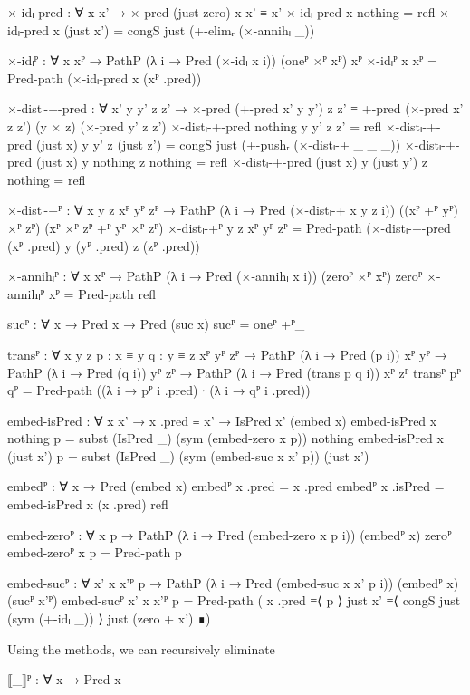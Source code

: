 \begin{code}[hide]
  ×-idₗ-pred : ∀ x x' → ×-pred (just zero) x x' ≡ x'
  ×-idₗ-pred x nothing = refl
  ×-idₗ-pred x (just x') = congS just (+-elimᵣ (×-annihₗ _))

  ×-idₗᴾ : ∀ {x} xᴾ → PathP (λ i → Pred (×-idₗ x i)) (oneᴾ ×ᴾ xᴾ) xᴾ
  ×-idₗᴾ {x} xᴾ = Pred-path (×-idₗ-pred x (xᴾ .pred))

  ×-distₗ-+-pred :
    ∀ x' y y' z z' →
    ×-pred (+-pred x' y y') z z' ≡
    +-pred (×-pred x' z z') (y × z) (×-pred y' z z')
  ×-distₗ-+-pred nothing y y' z z' = refl
  ×-distₗ-+-pred (just x) y y' z (just z') =
    congS just (+-pushᵣ (×-distₗ-+ _ _ _))
  ×-distₗ-+-pred (just x) y nothing z nothing = refl
  ×-distₗ-+-pred (just x) y (just y') z nothing = refl

  ×-distₗ-+ᴾ :
    ∀ {x y z} xᴾ yᴾ zᴾ →
    PathP (λ i → Pred (×-distₗ-+ x y z i))
      ((xᴾ +ᴾ yᴾ) ×ᴾ zᴾ) (xᴾ ×ᴾ zᴾ +ᴾ yᴾ ×ᴾ zᴾ)
  ×-distₗ-+ᴾ {y} {z} xᴾ yᴾ zᴾ =
    Pred-path (×-distₗ-+-pred (xᴾ .pred) y (yᴾ .pred) z (zᴾ .pred))

  ×-annihₗᴾ : ∀ {x} xᴾ → PathP (λ i → Pred (×-annihₗ x i)) (zeroᴾ ×ᴾ xᴾ) zeroᴾ
  ×-annihₗᴾ xᴾ = Pred-path refl

  sucᴾ : ∀ {x} → Pred x → Pred (suc x)
  sucᴾ = oneᴾ +ᴾ_

  transᴾ :
    ∀ {x y z} {p : x ≡ y} {q : y ≡ z} {xᴾ yᴾ zᴾ} →
    PathP (λ i → Pred (p i)) xᴾ yᴾ → PathP (λ i → Pred (q i)) yᴾ zᴾ →
    PathP (λ i → Pred (trans p q i)) xᴾ zᴾ
  transᴾ pᴾ qᴾ = Pred-path ((λ i → pᴾ i .pred) ∙ (λ i → qᴾ i .pred))

  embed-isPred : ∀ x x' → x .pred ≡ x' → IsPred x' (embed x)
  embed-isPred x nothing p = subst (IsPred _) (sym (embed-zero x p)) nothing
  embed-isPred x (just x') p =
    subst (IsPred _) (sym (embed-suc x x' p)) (just x')

  embedᴾ : ∀ x → Pred (embed x)
  embedᴾ x .pred = x .pred
  embedᴾ x .isPred = embed-isPred x (x .pred) refl

  embed-zeroᴾ : ∀ x p → PathP (λ i → Pred (embed-zero x p i)) (embedᴾ x) zeroᴾ
  embed-zeroᴾ x p = Pred-path p

  embed-sucᴾ :
    ∀ {x'} x x'ᴾ p →
    PathP (λ i → Pred (embed-suc x x' p i)) (embedᴾ x) (sucᴾ x'ᴾ)
  embed-sucᴾ {x'} x x'ᴾ p = Pred-path
    ( x .pred           ≡⟨ p ⟩
      just x'          ≡⟨ congS just (sym (+-idₗ _)) ⟩
      just (zero + x') ∎)
\end{code}
Using the methods, we can recursively eliminate
\begin{code}
  ⟦_⟧ᴾ : ∀ x → Pred x
\end{code}
